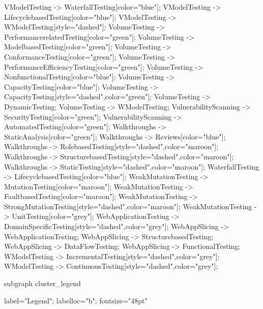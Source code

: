 \documentclass{article}
\begin{document}
{VModelTesting -> WaterfallTesting[color="blue"];
VModelTesting -> LifecyclebasedTesting[color="blue"];
VModelTesting -> WModelTesting[style="dashed"];
VolumeTesting -> PerformancerelatedTesting[color="green"];
VolumeTesting -> ModelbasedTesting[color="green"];
VolumeTesting -> ConformanceTesting[color="green"];
VolumeTesting -> PerformanceEfficiencyTesting[color="green"];
VolumeTesting -> NonfunctionalTesting[color="blue"];
VolumeTesting -> CapacityTesting[color="blue"];
VolumeTesting -> CapacityTesting[style="dashed",color="green"];
VolumeTesting -> DynamicTesting;
VolumeTesting -> WModelTesting;
VulnerabilityScanning -> SecurityTesting[color="green"];
VulnerabilityScanning -> AutomatedTesting[color="green"];
Walkthroughs -> StaticAnalysis[color="green"];
Walkthroughs -> Reviews[color="blue"];
Walkthroughs -> RolebasedTesting[style="dashed",color="maroon"];
Walkthroughs -> StructurebasedTesting[style="dashed",color="maroon"];
Walkthroughs -> StaticTesting[style="dashed",color="maroon"];
WaterfallTesting -> LifecyclebasedTesting[color="blue"];
WeakMutationTesting -> MutationTesting[color="maroon"];
WeakMutationTesting -> FaultbasedTesting[color="maroon"];
WeakMutationTesting -> StrongMutationTesting[style="dashed",color="maroon"];
WeakMutationTesting -> UnitTesting[color="grey"];
WebApplicationTesting -> DomainSpecificTesting[style="dashed",color="grey"];
WebAppSlicing -> WebApplicationTesting;
WebAppSlicing -> StructurebasedTesting;
WebAppSlicing -> DataFlowTesting;
WebAppSlicing -> FunctionalTesting;
WModelTesting -> IncrementalTesting[style="dashed",color="grey"];
WModelTesting -> ContinuousTesting[style="dashed",color="grey"];

subgraph cluster_legend {

    label="Legend";
    labelloc="b";
    fontsize="48pt"

}}
\end{document}
